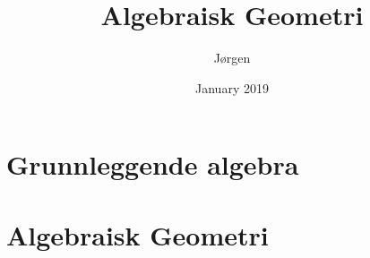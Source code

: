\documentclass{article}
\title{Algebraisk Geometri}
\author{Jørgen }
\date{January 2019}
\begin{document}
\maketitle

\section{Grunnleggende algebra}

\section{Algebraisk Geometri}

\end{document}
